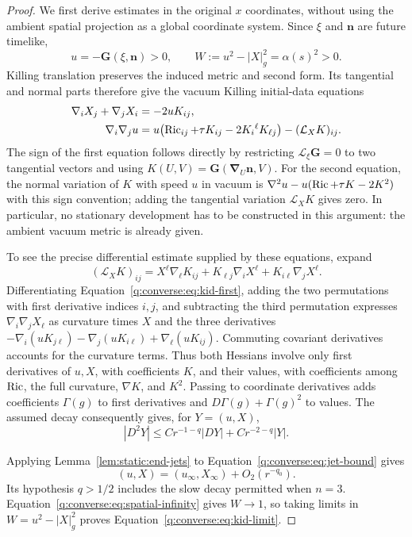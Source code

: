 \begin{proof}
We first derive estimates in the original $x$ coordinates, without using
the ambient spatial projection as a global coordinate system.  Since
$\xi$ and $\mathbf n$ are future timelike,
\[
 u=-\mathbf G(\xi,\mathbf n)>0,
 \qquad W:=u^2-|X|_g^2=\alpha(s)^2>0.
\]
Killing translation preserves the induced metric and second form.
Its tangential and normal parts therefore give the vacuum Killing
initial-data equations
\begin{align}
 \nabla_iX_j+\nabla_jX_i&=-2uK_{ij},
 \label{q:converse:eq:kid-first}\\
 \nabla_i\nabla_ju
 &=u\bigl(\operatorname{Ric}_{ij}+\tau K_{ij}-2K_i{}^\ell K_{\ell j}\bigr)
       -(\mathcal L_XK)_{ij}.
 \label{q:converse:eq:kid-second}
\end{align}
The sign of the first equation follows directly by restricting
$\mathcal L_\xi\mathbf G=0$ to two tangential vectors and using
$K(U,V)=\mathbf G(\boldsymbol\nabla_U\mathbf n,V)$.
For the second equation, the normal variation of $K$ with speed $u$ in
vacuum is
$\nabla^2u-u(\operatorname{Ric}+\tau K-2K^2)$ with this sign convention;
adding the tangential variation $\mathcal L_XK$ gives zero.
In particular, no stationary development has to be constructed in this
argument: the ambient vacuum metric is already given.

To see the precise differential estimate supplied by these equations,
expand
\[
 (\mathcal L_XK)_{ij}
 =X^\ell\nabla_\ell K_{ij}
   +K_{\ell j}\nabla_iX^\ell+K_{i\ell}\nabla_jX^\ell.
\]
Differentiating Equation~\eqref{q:converse:eq:kid-first}, adding the two
permutations with first derivative indices $i,j$, and subtracting the
third permutation expresses $\nabla_i\nabla_jX_\ell$ as curvature times
$X$ and the three derivatives
$-\nabla_i(uK_{j\ell})-\nabla_j(uK_{i\ell})+
\nabla_\ell(uK_{ij})$.  Commuting covariant derivatives accounts for
the curvature terms.  Thus both Hessians involve only first derivatives
of $u,X$, with coefficients $K$, and their values, with coefficients
among $\operatorname{Ric}$, the full curvature, $\nabla K$, and $K^2$.
Passing to coordinate derivatives adds coefficients $\Gamma(g)$ to
first derivatives and $D\Gamma(g)+\Gamma(g)^2$ to values.  The assumed
decay consequently gives, for $Y=(u,X)$,
\begin{equation}
 |D^2Y|\le C r^{-1-q}|DY|+C r^{-2-q}|Y|.
 \label{q:converse:eq:jet-bound}
\end{equation}

Applying Lemma~\ref{lem:static:end-jets} to
Equation~\eqref{q:converse:eq:jet-bound} gives
\[
 (u,X)=(u_\infty,X_\infty)+O_2(r^{-q_0}).
\]
Its hypothesis $q>1/2$ includes the slow decay permitted when $n=3$.
Equation~\eqref{q:converse:eq:spatial-infinity} gives $W\to1$, so taking
limits in $W=u^2-|X|_g^2$ proves
Equation~\eqref{q:converse:eq:kid-limit}.


\end{proof}
